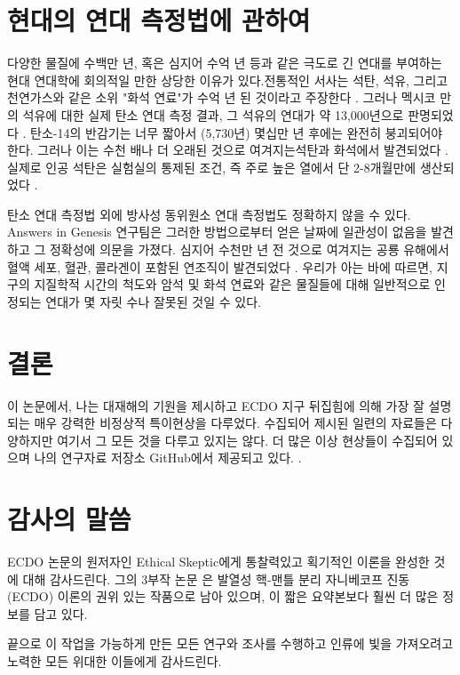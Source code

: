 \documentclass[10pt,twocolumn,letterpaper]{article}
\begin{document}
\section{현대의 연대 측정법에 관하여}

다양한 물질에  수백만 년, 혹은 심지어 수억 년 등과 같은 극도로 긴 연대를  부여하는 현대 연대학에 회의적일 만한 상당한 이유가 있다.전통적인 서사는 석탄, 석유, 그리고 천연가스와 같은 소위 "화석 연료"가 수억 년 된 것이라고 주장한다 \cite{104}. 그러나 멕시코 만의 석유에 대한 실제 탄소 연대 측정 결과, 그 석유의 연대가 약 13,000년으로 판명되었다 \cite{105}. 탄소-14의 반감기는 너무 짧아서 (5,730년) 몇십만 년 후에는 완전히 붕괴되어야 한다. 그러나 이는 수천 배나 더 오래된 것으로 여겨지는석탄과 화석에서 발견되었다 \cite{106}. 실제로 인공 석탄은 실험실의 통제된 조건, 즉 주로 높은 열에서 단 2-8개월만에 생산되었다 \cite{107}.

탄소 연대 측정법 외에  방사성 동위원소 연대 측정법도 정확하지 않을 수 있다. Answers in Genesis 연구팀은 그러한 방법으로부터 얻은 날짜에 일관성이 없음을 발견하고 그 정확성에 의문을 가졌다\cite{108}. 심지어 수천만 년 전 것으로 여겨지는 공룡 유해에서 혈액 세포, 혈관, 콜라겐이 포함된 연조직이 발견되었다 \cite{109,110}. 우리가 아는 바에 따르면, 지구의 지질학적 시간의 척도와 암석 및 화석 연료와 같은 물질들에 대해 일반적으로 인정되는 연대가 몇 자릿 수나 잘못된 것일 수 있다.

\section{결론}

이 논문에서, 나는 대재해의 기원을 제시하고 ECDO 지구 뒤집힘에 의해 가장 잘 설명되는 매우 강력한 비정상적 특이현상을 다루었다. 수집되어 제시된 일련의 자료들은 다양하지만 여기서 그 모든 것을 다루고 있지는 않다.  더 많은 이상 현상들이 수집되어 있으며 나의 연구자료 저장소 GitHub에서 제공되고 있다.  \cite{2}.

\section{감사의 말씀}

 ECDO 논문의 원저자인 Ethical Skeptic에게 통찰력있고 획기적인 이론을 완성한 것에 대해 감사드린다. 그의 3부작 논문 \cite{1}은 발열성 핵-맨틀 분리 자니베코프 진동 (ECDO) 이론의 권위 있는 작품으로 남아 있으며, 이 짧은 요약본보다 훨씬 더 많은 정보를 담고 있다.

끝으로 이 작업을 가능하게 만든 모든 연구와 조사를 수행하고 인류에 빛을 가져오려고 노력한 모든 위대한 이들에게 감사드린다.

\clearpage
\twocolumn

{\small
\renewcommand{\refname}{참고문헌}


}
\end{document}
